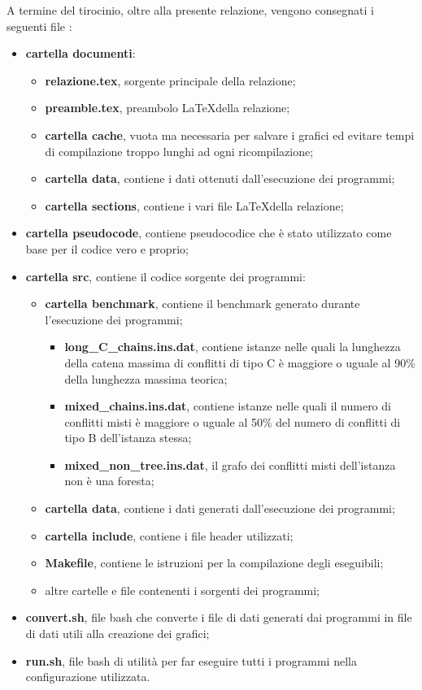 \documentclass[../../relazione.tex]{subfiles}
\begin{document}
A termine del tirocinio, oltre alla presente relazione, vengono consegnati i seguenti file :
\begin{itemize}
    \item \textbf{cartella documenti}:
          \begin{itemize}
              \item \textbf{relazione.tex}, sorgente principale della relazione;
              \item \textbf{preamble.tex}, preambolo \LaTeX della relazione;
              \item \textbf{cartella cache}, vuota ma necessaria per salvare i grafici ed evitare tempi di compilazione troppo lunghi ad ogni ricompilazione;
              \item \textbf{cartella data}, contiene i dati ottenuti dall'esecuzione dei programmi;
              \item \textbf{cartella sections}, contiene i vari file \LaTeX della relazione;
          \end{itemize}
    \item \textbf{cartella pseudocode}, contiene pseudocodice che è stato utilizzato come base per il codice vero e proprio;
    \item \textbf{cartella src}, contiene il codice sorgente dei programmi:
          \begin{itemize}
              \item \textbf{cartella benchmark}, contiene il benchmark generato durante l'esecuzione dei programmi;
                    \begin{itemize}
                        \item \textbf{long\_C\_chains.ins.dat}, contiene istanze nelle quali la lunghezza della catena massima di conflitti di tipo C è maggiore o uguale
                              al 90\% della lunghezza massima teorica;
                        \item \textbf{mixed\_chains.ins.dat}, contiene istanze nelle quali il numero di conflitti misti è maggiore o uguale al 50\% del numero di conflitti di tipo B dell'istanza stessa;
                        \item \textbf{mixed\_non\_tree.ins.dat}, il grafo dei conflitti misti dell'istanza non è una foresta;
                    \end{itemize}
              \item \textbf{cartella data}, contiene i dati generati dall'esecuzione dei programmi;
              \item \textbf{cartella include}, contiene i file header utilizzati;
              \item \textbf{Makefile}, contiene le istruzioni per la compilazione degli eseguibili;
              \item altre cartelle e file contenenti i sorgenti dei programmi;
          \end{itemize}
    \item \textbf{convert.sh}, file bash che converte i file di dati generati dai programmi in file di dati utili alla creazione dei grafici;
    \item \textbf{run.sh}, file bash di utilità per far eseguire tutti i programmi nella configurazione utilizzata.
\end{itemize}
\end{document}
